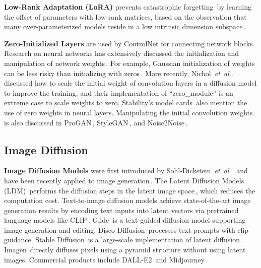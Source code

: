 \documentclass[10pt,twocolumn,letterpaper]{article}
\makeatletter
\DeclareRobustCommand\onedot{\futurelet\@let@token\@onedot}
\def\@onedot{\ifx\@let@token.\else.\null\fi\xspace}
\def\etal{\emph{et~al}\onedot}
\def\para#1{\vspace{0.25em}\noindent\textbf{#1}}
\makeatother
\begin{document}
	\para{Low-Rank Adaptation (LoRA)} prevents catastrophic
	forgetting\,\cite{hu2021lora} by learning the offset of parameters with low-rank matrices, based on the observation that many
	over-parameterized models reside in a low intrinsic
	dimension subspace\,\cite{aghajanyan2021intrinsic,li2018measuring}.
	
	\para{Zero-Initialized Layers} are used by ControlNet for connecting
	network blocks. Research on neural networks has extensively discussed
	the initialization and manipulation of network
	weights\,\cite{karras2017progressive,karras2019style,LeCun2015,lecun1998gradient,lehtinen2018noise2noise,Rumelhart1986,sdd,zhao2021zero}.
	For example, Gaussian initialization of weights can be less risky than
	initializing with zeros\,\cite{arfin2020weight}.  More recently,
	Nichol~\etal~\cite{nichol2021improved} discussed how to scale the
	initial weight of convolution layers in a diffusion model to improve
	the training, and their implementation of ``zero\_module'' is an
	extreme case to scale weights to zero.  Stability's model
	cards\,\cite{sdd} also mention the use of zero weights in neural
	layers.  Manipulating the initial convolution weights is also
	discussed in ProGAN\,\cite{karras2017progressive},
	StyleGAN\,\cite{karras2019style},
	and Noise2Noise\,\cite{lehtinen2018noise2noise}.
	
	\subsection{Image Diffusion}
	
	\para{Image Diffusion Models} were first introduced by
	Sohl-Dickstein~\etal\,\cite{sohl2015deep} and have been recently
	applied to image
	generation\,\cite{dhariwal2021diffusion,kingma2021variational}.
	The Latent Diffusion Models (LDM)\,\cite{rombach2021highresolution}
	performs the diffusion steps in the latent image
	space\,\cite{esser2021taming}, which reduces the computation cost.
	Text-to-image diffusion
	models achieve state-of-the-art image generation results by encoding
	text inputs into latent vectors via pretrained language models like
	CLIP\,\cite{radford2021learning}.  Glide\,\cite{nichol2021glide} is a
	text-guided diffusion model supporting image generation and editing.
	Disco Diffusion\,\cite{disco} processes text prompts with clip guidance.
	Stable Diffusion\,\cite{sd15} is a large-scale implementation of
	latent diffusion\,\cite{rombach2021highresolution}.
	Imagen\,\cite{saharia2022photorealistic} directly diffuses pixels
	using a pyramid structure without using latent images.  Commercial
	products include DALL-E2\,\cite{DALLE2} and
	Midjourney\,\cite{midjourney}.
	
\end{document}

